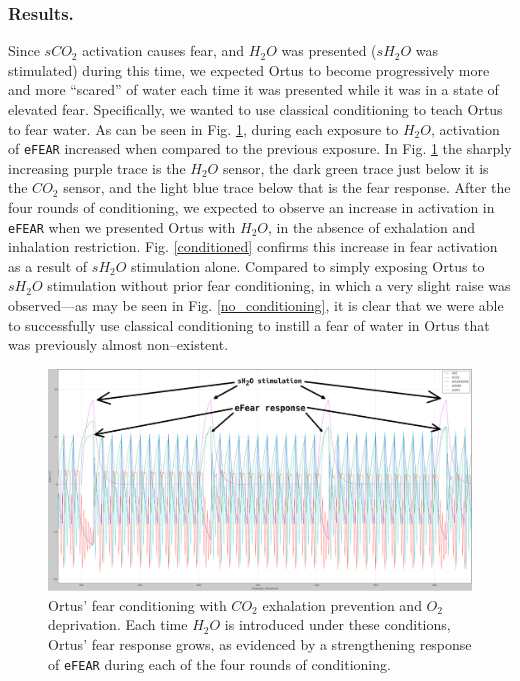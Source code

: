 \documentclass[letterpaper]{article}
\begin{document}
\subsubsection{Results.} Since $sCO_2$ activation causes fear, and $H_2O$ was presented ($sH_2O$ was stimulated) during this time, we expected Ortus to become progressively more and more ``scared'' of water each time it was presented while it was in a state of elevated fear.
Specifically, we wanted to use classical conditioning to teach Ortus to fear water. 
As can be seen in Fig. \ref{conditioning}, during each exposure to $H_2O$, activation of \texttt{eFEAR} increased when compared to the previous exposure.
In Fig. \ref{conditioning} the sharply increasing purple trace is the $H_2O$ sensor, the dark green trace just below it is the $CO_2$ sensor, and the light blue trace below that is the fear response.
After the four rounds of conditioning, we expected to observe an increase in activation in \texttt{eFEAR} when we presented Ortus with $H_2O$, in the absence of exhalation and inhalation restriction. Fig. \ref{conditioned} confirms this increase in fear activation as a result of $sH_2O$ stimulation alone. Compared to simply exposing Ortus to $sH_2O$ stimulation without prior fear conditioning, in which a very slight raise was observed---as may be seen in Fig. \ref{no_conditioning}, it is clear that we were able to successfully use classical conditioning to instill a fear of water in Ortus that was previously almost non--existent. 


\setlength{\belowcaptionskip}{-.25in}

\begin{figure}
\begin{center}
\includegraphics[width=\textwidth]{images/conditioning_small_annotated.png}
\caption{Ortus' fear conditioning with $CO_2$ exhalation prevention and $O_2$ deprivation. Each time $H_2O$ is introduced under these conditions, Ortus' fear response grows, as evidenced by a strengthening response of \texttt{eFEAR} during each of the four rounds of conditioning.}
\label{conditioning}
\end{center}
\end{figure}
\end{document}
